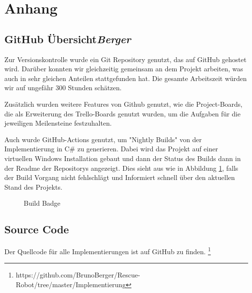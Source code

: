 
\section{Anhang}

\subsection{GitHub Übersicht\hfill\textnormal{\emph{Berger}}}

Zur Versionskontrolle wurde ein Git Repository genutzt, 
das auf GitHub gehostet wird.
Darüber konnten wir gleichzeitig gemeinsam an dem Projekt arbeiten,
was auch in sehr gleichen Anteilen stattgefunden hat.
Die gesamte Arbeitszeit würden wir auf ungefähr 300 Stunden schätzen.

Zusätzlich wurden weitere Features von Github genutzt, 
wie die Project-Boards,
die als Erweiterung des Trello-Boards genutzt wurden, 
um die Aufgaben für die jeweiligen Meilensteine festzuhalten.

Auch wurde GitHub-Actions genutzt, 
um "Nightly Builds" von der Implementierung in C\# zu generieren.
Dabei wird das Projekt auf einer virtuellen Windows Installation gebaut 
und dann der Status des Builds dann in der Readme der Repositorys angezeigt.
Dies sieht aus wie in Abbildung \ref{fig:buildBadge}, 
falls der Build Vorgang nicht fehlschlägt
und Informiert schnell über den aktuellen Stand des Projekts.

\begin{figure}[H]
  \caption{Build Badge}
  \label{fig:buildBadge}
\end{figure}


\subsection{Source Code}

Der Quellcode für alle Implementierungen ist auf GitHub zu finden.
\footnote{https://github.com/BrunoBerger/Rescue-Robot/tree/master/Implementierung}